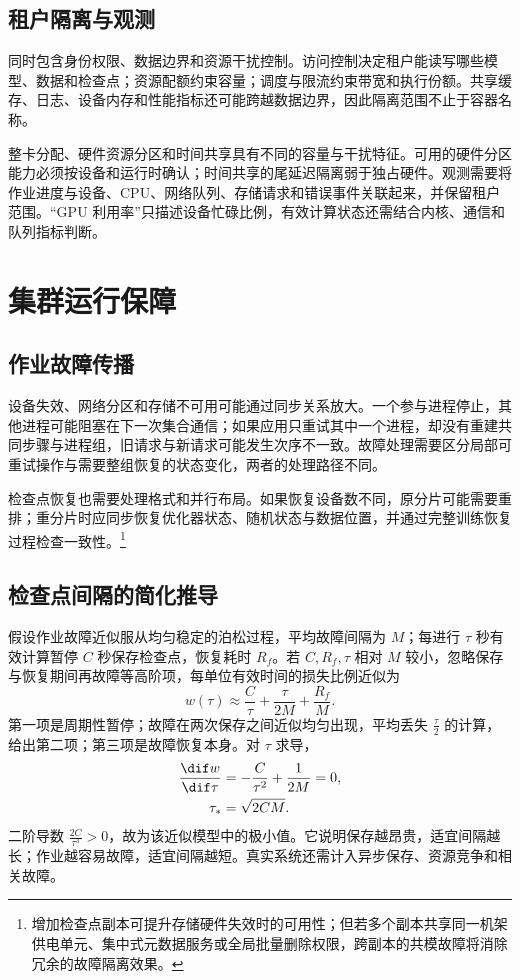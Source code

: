 \documentclass[../textbook.tex]{subfiles}
\begin{document}
\subsection{租户隔离与观测}
同时包含身份权限、数据边界和资源干扰控制。访问控制决定租户能读写哪些模型、数据和检查点；资源配额约束容量；调度与限流约束带宽和执行份额。共享缓存、日志、设备内存和性能指标还可能跨越数据边界，因此隔离范围不止于容器名称。

整卡分配、硬件资源分区和时间共享具有不同的容量与干扰特征。可用的硬件分区能力必须按设备和运行时确认；时间共享的尾延迟隔离弱于独占硬件。观测需要将作业进度与设备、CPU、网络队列、存储请求和错误事件关联起来，并保留租户范围。“GPU 利用率”只描述设备忙碌比例，有效计算状态还需结合内核、通信和队列指标判断。

\section{集群运行保障}
\optional
\subsection{作业故障传播}
设备失效、网络分区和存储不可用可能通过同步关系放大。一个参与进程停止，其他进程可能阻塞在下一次集合通信；如果应用只重试其中一个进程，却没有重建共同步骤与进程组，旧请求与新请求可能发生次序不一致。故障处理需要区分局部可重试操作与需要整组恢复的状态变化，两者的处理路径不同。

检查点恢复也需要处理格式和并行布局。如果恢复设备数不同，原分片可能需要重排；重分片时应同步恢复优化器状态、随机状态与数据位置，并通过完整训练恢复过程检查一致性。\footnote{增加检查点副本可提升存储硬件失效时的可用性；但若多个副本共享同一机架供电单元、集中式元数据服务或全局批量删除权限，跨副本的共模故障将消除冗余的故障隔离效果。}

\subsection{检查点间隔的简化推导}
假设作业故障近似服从均匀稳定的泊松过程，平均故障间隔为 $M$；每进行 $\tau$ 秒有效计算暂停 $C$ 秒保存检查点，恢复耗时 $R_f$。若 $C,R_f,\tau$ 相对 $M$ 较小，忽略保存与恢复期间再故障等高阶项，每单位有效时间的损失比例近似为
\begin{equation}
 w(\tau)\approx\frac{C}{\tau}+\frac{\tau}{2M}+\frac{R_f}{M}.
 \label{eq:infra-checkpoint-loss}
\end{equation}
第一项是周期性暂停；故障在两次保存之间近似均匀出现，平均丢失 $\frac{\tau}{2}$ 的计算，给出第二项；第三项是故障恢复本身。对 $\tau$ 求导，
\begin{equation}
 \begin{aligned}
  \frac{\dif w}{\dif\tau} &= -\frac{C}{\tau^2}+\frac{1}{2M}=0, \\
  \tau_* &= \sqrt{2CM}.
 \end{aligned}
\end{equation}
二阶导数 $\frac{2C}{\tau^3}>0$，故为该近似模型中的极小值。它说明保存越昂贵，适宜间隔越长；作业越容易故障，适宜间隔越短。真实系统还需计入异步保存、资源竞争和相关故障。
\end{document}
